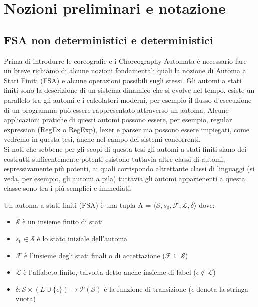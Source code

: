 \chapter{Nozioni preliminari e notazione}
\label{cap:Preliminaries}
\section{FSA non deterministici e deterministici}
Prima di introdurre le coreografie e i Choreography Automata è necessario fare un breve richiamo di alcune nozioni fondamentali quali la nozione di Automa a Stati Finiti (FSA)\cite{Linguaggi_di_Prorgammazione} e alcune operazioni possibili sugli stessi.
Gli automi a stati finiti sono la descrizione di un sistema dinamico che si evolve nel tempo, esiste un parallelo tra gli automi e i calcolatori moderni, per esempio il flusso d'esecuzione di un programma può essere rappresentato attraverso un automa.
Alcune applicazioni pratiche di questi automi possono essere, per esempio, regular expression (RegEx o RegExp), lexer e parser ma possono essere impiegati, come vedremo in questa tesi, anche nel campo dei sistemi concorrenti.\\
Si noti che sebbene per gli scopi di questa tesi gli automi a stati finiti siano dei costrutti sufficentemente potenti esistono tuttavia altre classi di automi, espressivamente più potenti, ai quali corrispondo altrettante classi di linguaggi (si veda, per esempio, gli automi a pila) tuttavia gli automi appartenenti a questa classe sono tra i più semplici e immediati.

\begin{definition}
    Un automa a stati finiti (FSA) è una tupla A = $\langle \mathcal{S}, s_0, \mathcal{F}, \mathcal{L}, \delta \rangle$ dove:
    \begin{itemize}
        \item $\mathcal{S}$ è un insieme finito di stati
        \item $s_0 \in \mathcal{S}$ è lo stato iniziale dell'automa
        \item $\mathcal{F}$ è l'insieme degli stati finali o di accettazione ($\mathcal{F} \subseteq \mathcal{S}$)
        \item $\mathcal{L}$ è l'alfabeto finito, talvolta detto anche insieme di label ($\epsilon \notin \mathcal{L}$)
        \item $\delta : \mathcal{S} \times (L \cup \{\epsilon\}) \rightarrow \mathcal{P}(\mathcal{S})$ è la funzione di transizione ($\epsilon$ denota la stringa vuota)
    \end{itemize}
\end{definition}

